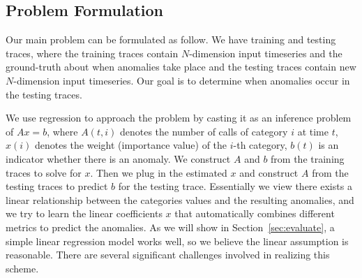 \subsection{Problem Formulation}

Our main problem can be formulated as follow. We have training and
testing traces, where the training traces contain $N$-dimension input
timeseries and the ground-truth about when anomalies take place and
the testing traces contain new $N$-dimension input timeseries. Our
goal is to determine when anomalies occur in the testing traces. 

We use regression to approach
the problem by casting it as an inference problem of $A x = b$, where
$A(t,i)$ denotes the number of calls of category $i$ at time $t$, $x(i)$ denotes
the weight (importance value) of the $i$-th category, $b(t)$ is an
indicator whether there is an anomaly. We construct $A$ and $b$ from the training traces to solve
for $x$. Then we plug in the estimated $x$ and construct $A$ from
the testing traces to predict $b$ for the testing trace. 
Essentially we view there
exists a linear relationship between the categories values and the
resulting anomalies, and we try to learn the linear coefficients $x$
that automatically combines different metrics to predict the
anomalies. 
As we will show in Section~\ref{sec:evaluate}, a 
simple linear regression model works well, so we believe the 
linear assumption is reasonable.
There are several significant challenges involved in realizing this scheme.

